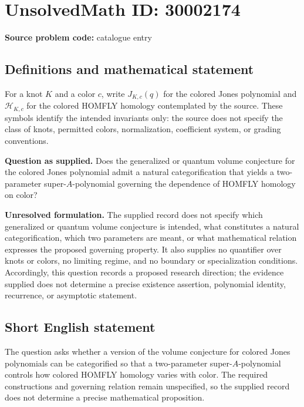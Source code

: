 \documentclass[11pt]{article}
\begin{document}
\section*{UnsolvedMath ID: 30002174}
\textbf{Source problem code:} catalogue entry
\subsection{Definitions and mathematical statement}
For a knot \(K\) and a color \(c\), write \(J_{K,c}(q)\) for the colored Jones polynomial and \(\mathcal H_{K,c}\) for the colored HOMFLY homology contemplated by the source. These symbols identify the intended invariants only: the source does not specify the class of knots, permitted colors, normalization, coefficient system, or grading conventions.

\textbf{Question as supplied.} Does the generalized or quantum volume conjecture for the colored Jones polynomial admit a natural categorification that yields a two-parameter super-\(A\)-polynomial governing the dependence of HOMFLY homology on color?

\textbf{Unresolved formulation.} The supplied record does not specify which generalized or quantum volume conjecture is intended, what constitutes a natural categorification, which two parameters are meant, or what mathematical relation expresses the proposed governing property. It also supplies no quantifier over knots or colors, no limiting regime, and no boundary or specialization conditions. Accordingly, this question records a proposed research direction; the evidence supplied does not determine a precise existence assertion, polynomial identity, recurrence, or asymptotic statement.
\subsection{Short English statement}
The question asks whether a version of the volume conjecture for colored Jones polynomials can be categorified so that a two-parameter super-\(A\)-polynomial controls how colored HOMFLY homology varies with color. The required constructions and governing relation remain unspecified, so the supplied record does not determine a precise mathematical proposition.
\end{document}
